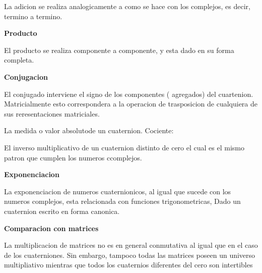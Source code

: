 \documentclass[10pt,a4paper]{report}
\begin{document}
\begin{center}
\begin{flushleft}
\begin{flushleft}
\begin{flushleft}
\begin{flushleft}
\begin{flushleft}
\begin{flushleft}
\begin{flushleft}
\begin{flushleft}
La adicion se realiza analogicamente a como se hace con los complejos, es decir, termino a termino.
\begin{flushleft}
\textbf{Producto}
\begin{flushleft}
El producto se realiza componente a componente, y esta dado en su forma completa.
\begin{flushleft}
\textbf{Conjugacion}
\begin{flushleft}
El conjugado interviene el signo de los componentes ( agregados) del cuartenion. Matricialmente esto correspondera a la operacion de trasposicion de cualquiera de sus reresentaciones matriciales.
\begin{flushleft}
La medida o valor absolutode un cuaternion.
Cociente:
\begin{flushleft}
El inverso multiplicativo de un cuaternion distinto de cero el cual es el mismo patron que cumplen los numeros ccomplejos.
\begin{flushleft}
\textbf{Exponenciacion}

\begin{flushleft}
La exponenciacion de numeros cuaternionicos, al igual que sucede con los numeros complejos, esta relacionada con funciones trigonometricas, Dado un cuaternion escrito en forma canonica.
\begin{flushleft}
\textbf{Comparacion con matrices}
\begin{flushleft}
La multiplicacion de matrices no es en general conmutativa al igual que en el caso de los cuaterniones. Sin embargo, tampoco todas las matrices poseen un universo multipliativo mientras que todos los cuaternios diferentes del cero son intertibles 
\end{flushleft}
\end{flushleft}
\end{flushleft}
\end{flushleft}
\end{flushleft}
\end{flushleft}
\end{flushleft}
\end{flushleft}
\end{flushleft}
\end{flushleft}
\end{flushleft}
\end{flushleft}
\end{flushleft}

\end{flushleft}
\end{flushleft}
\end{flushleft}
\end{flushleft}
\end{flushleft}
\end{center}
\end{document}
